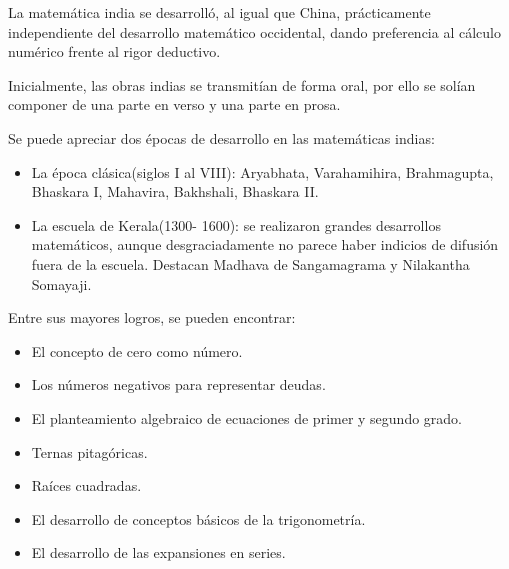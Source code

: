 \documentclass[compress, aspectratio=169]{beamer} %
\begin{document}
	\begin{frame}
		La matemática india se desarrolló, al igual que China, prácticamente independiente del desarrollo matemático
		occidental, dando preferencia al cálculo numérico frente al rigor deductivo.

		Inicialmente, las obras indias se transmitían de forma oral, por ello se solían componer de una parte en verso y
		una parte en prosa.
		
		\pause
		
		Se puede apreciar dos épocas de desarrollo en las matemáticas indias:
		\begin{itemize}
			\item La época clásica(siglos I al VIII): Aryabhata, Varahamihira, Brahmagupta, Bhaskara I, Mahavira,
			Bakhshali, Bhaskara II.
			\item La escuela de Kerala(1300- 1600): se realizaron grandes desarrollos matemáticos, aunque desgraciadamente
			no parece haber indicios de difusión fuera de la escuela. Destacan Madhava de Sangamagrama y Nilakantha Somayaji.
		\end{itemize}
	\end{frame}
	\begin{frame}
		Entre sus mayores logros, se pueden encontrar:
		\begin{itemize}
			\item El concepto de cero como número.
			\item Los números negativos para representar deudas.
			\item El planteamiento algebraico de ecuaciones de primer y segundo grado.
			\item Ternas pitagóricas.
			\item Raíces cuadradas.
			\item El desarrollo de conceptos básicos de la trigonometría.
			\item El desarrollo de las expansiones en series.
		\end{itemize}
	\end{frame}
\end{document}

